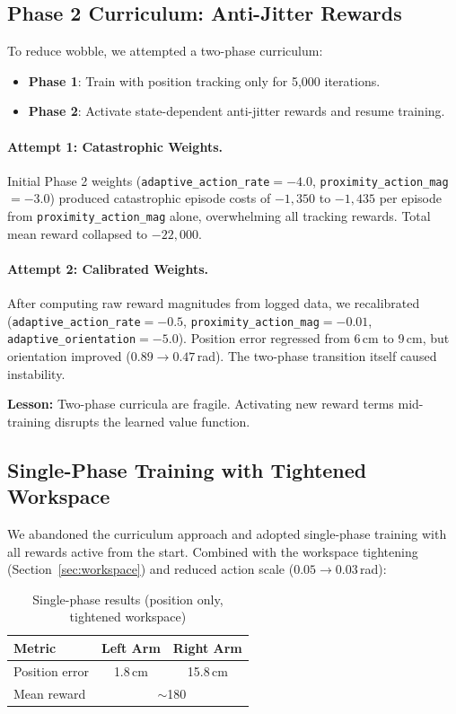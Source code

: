 \documentclass[11pt,a4paper]{article}
\begin{document}
\subsection{Phase 2 Curriculum: Anti-Jitter Rewards}
\label{sec:phase2}
To reduce wobble, we attempted a two-phase curriculum:
\begin{itemize}[nosep]
  \item \textbf{Phase 1}: Train with position tracking only for 5,000 iterations.
  \item \textbf{Phase 2}: Activate state-dependent anti-jitter rewards and resume training.
\end{itemize}

\paragraph{Attempt 1: Catastrophic Weights.}
Initial Phase 2 weights (\texttt{adaptive\_action\_rate}$=-4.0$, \texttt{proximity\_action\_mag}$=-3.0$) produced catastrophic episode costs of $-1,350$ to $-1,435$ per episode from \texttt{proximity\_action\_mag} alone, overwhelming all tracking rewards. Total mean reward collapsed to $-22,000$.

\paragraph{Attempt 2: Calibrated Weights.}
After computing raw reward magnitudes from logged data, we recalibrated (\texttt{adaptive\_action\_rate}$=-0.5$, \texttt{proximity\_action\_mag}$=-0.01$, \texttt{adaptive\_orientation}$=-5.0$). Position error regressed from 6\,cm to 9\,cm, but orientation improved ($0.89\to0.47$\,rad). The two-phase transition itself caused instability.

\textbf{Lesson:} Two-phase curricula are fragile. Activating new reward terms mid-training disrupts the learned value function.

\subsection{Single-Phase Training with Tightened Workspace}
\label{sec:single_phase}
We abandoned the curriculum approach and adopted single-phase training with all rewards active from the start. Combined with the workspace tightening (Section~\ref{sec:workspace}) and reduced action scale ($0.05\to0.03$\,rad):

\begin{table}[H]
\centering
\caption{Single-phase results (position only, tightened workspace)}
\begin{tabular}{@{}lcc@{}}
\toprule
\textbf{Metric} & \textbf{Left Arm} & \textbf{Right Arm} \\
\midrule
Position error & 1.8\,cm & 15.8\,cm \\
Mean reward & \multicolumn{2}{c}{$\sim$180} \\
\bottomrule
\end{tabular}
\end{table}
\end{document}
